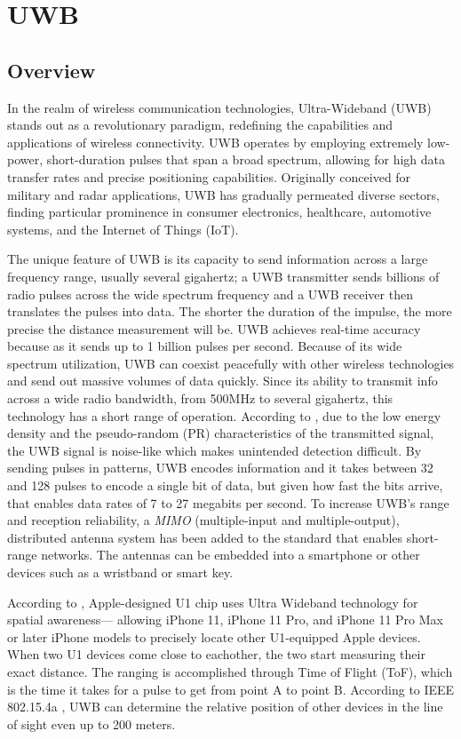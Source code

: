 \documentclass[english]{article}
\begin{document}
\section{UWB}\label{sec:uwb}
\subsection{Overview}
In the realm of wireless communication technologies, Ultra-Wideband (UWB) stands out as a revolutionary paradigm, redefining the capabilities and applications of wireless connectivity. UWB operates by employing extremely low-power, short-duration pulses that span a broad spectrum, allowing for high data transfer rates and precise positioning capabilities. Originally conceived for military and radar applications, UWB has gradually permeated diverse sectors, finding particular prominence in consumer electronics, healthcare, automotive systems, and the Internet of Things (IoT).

The unique feature of UWB is its capacity to send information across a large frequency range, usually several gigahertz; a UWB transmitter sends billions of radio pulses across the wide spectrum frequency and a UWB receiver then translates the pulses into data. The shorter the duration of the impulse, the more precise the distance measurement will be. UWB achieves real-time accuracy because as it sends up to 1 billion pulses per second. Because of its wide spectrum utilization, UWB can coexist peacefully with other wireless technologies and send out massive volumes of data quickly.  Since its ability to transmit info across a wide radio bandwidth, from 500MHz to several gigahertz, this technology has a short range of operation. According to \cite{di2006uwb}, due to the low energy density and the pseudo-random (PR) characteristics of the transmitted signal, the UWB signal is noise-like which makes unintended detection difficult. By sending pulses in patterns, UWB encodes information and it takes between 32 and 128 pulses to encode a single bit of data, but given how fast the bits arrive, that enables data rates of 7 to 27 megabits per second. To increase UWB’s range and reception reliability, a \textit{MIMO} (multiple-input and multiple-output), distributed antenna system has been added to the standard that enables short-range networks. The antennas can be embedded into a smartphone or other devices such as a wristband or smart key.

According to \cite{aps}, Apple-designed U1 chip uses Ultra Wideband technology for spatial awareness— allowing iPhone 11, iPhone 11 Pro, and iPhone 11 Pro Max or later iPhone models to precisely locate other U1-equipped Apple devices.
When two U1 devices come close to eachother, the two start measuring their exact distance. The ranging is accomplished through Time of Flight (ToF), which is the time it takes for a pulse to get from point A to point B. According to IEEE 802.15.4a \cite{5394030}, UWB can determine the relative position of other devices in the line of sight even up to 200 meters.
\end{document}
